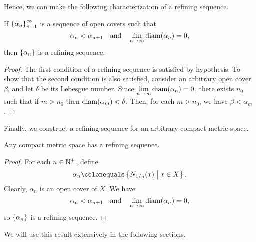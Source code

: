 \documentclass[10pt,twoside,draft]{book}
\begin{document}
Hence, we can make the following characterization of a refining sequence.
\begin{corollary}
  If $\left \{ \alpha_n \right \}^{\infty}_{n = 1}$ is a sequence of open covers such that
  \begin{equation*}
    \alpha_n < \alpha_{n+1} 
    \quad\mbox{and}\quad
    \lim\limits_{n \to \infty} \mathrm{diam}(\alpha_n) = 0,
  \end{equation*}
  then $\left \{ \alpha_n \right \}$ is a refining sequence.
  \begin{proof}
    The first condition of a refining sequence is satisfied by hypothesis.
    To show that the second condition is also satisfied, consider an arbitrary open cover $\beta$, and let $\delta$ be its Lebesgue number.
    Since $\lim\limits_{n \to \infty} \mathrm{diam}(\alpha_n) = 0$, there exists $n_0$ such that if $m > n_0$ then $\mathrm{diam}(\alpha_m) < \delta$.
    Then, for each $m > n_0$, we have $\beta < \alpha_m$.
  \end{proof}
\end{corollary}
Finally, we construct a refining sequence for an arbitrary compact metric space.
\begin{corollary}
  Any compact metric space has a refining sequence.
  \begin{proof}
    For each $n \in \mathbb{N}^+$, define
    \begin{equation*}
      \alpha_n \ceq \setst{\oball{1/n}{x}}{x \in X}.
    \end{equation*}
    Clearly, $\alpha_n$ is an open cover of $X$.
    We have
    \begin{equation*}
      \alpha_n < \alpha_{n+1}
      \quad\mbox{and}\quad
      \lim\limits_{n \to \infty} \mathrm{diam}(\alpha_n) = 0,
    \end{equation*}
    so $\left \{ \alpha_n \right \}$ is a refining sequence.
  \end{proof}
\end{corollary}
We will use this result extensively in the following sections.
\end{document}
